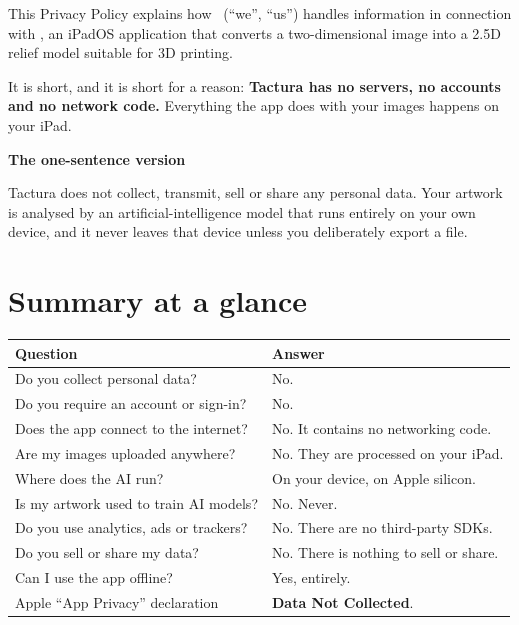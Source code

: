 \documentclass[11pt]{article}
\newcommand{\publisher}{\ph{DEVELOPER LEGAL NAME}}
\begin{document}
\legaltitle

This Privacy Policy explains how \publisher\ (“we”, “us”) handles information in
connection with , an iPadOS application that converts a two-dimensional
image into a 2.5D relief model suitable for 3D printing.

It is short, and it is short for a reason: \textbf{Tactura has no servers, no accounts and no
network code.} Everything the app does with your images happens on your iPad.

\begin{keybox}
{\headingfont\bfseries\fontsize{12}{14}\selectfont The one-sentence version}\par
\vspace{1.5mm}
Tactura does not collect, transmit, sell or share any personal data. Your artwork
is analysed by an artificial-intelligence model that runs entirely on your own
device, and it never leaves that device unless you deliberately export a file.
\end{keybox}

\section{Summary at a glance}

\begin{plainbox}
\uifont\small
\begin{tabular}{@{}p{}p{}@{}}
\toprule
\textbf{Question} & \textbf{Answer} \\
\midrule
Do you collect personal data?            & No. \\
Do you require an account or sign-in?    & No. \\
Does the app connect to the internet?    & No. It contains no networking code. \\
Are my images uploaded anywhere?         & No. They are processed on your iPad. \\
Where does the AI run?                   & On your device, on Apple silicon. \\
Is my artwork used to train AI models?   & No. Never. \\
Do you use analytics, ads or trackers?   & No. There are no third-party SDKs. \\
Do you sell or share my data?            & No. There is nothing to sell or share. \\
Can I use the app offline?               & Yes, entirely. \\
Apple “App Privacy” declaration        & \textbf{Data Not Collected}. \\
\bottomrule
\end{tabular}
\end{plainbox}
\end{document}
